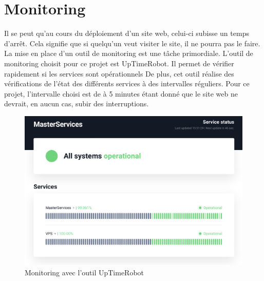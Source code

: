 \section{Monitoring}
Il se peut qu'au cours du déploiement d'un site web, celui-ci subisse un temps d'arrêt. Cela signifie que si quelqu'un veut visiter le site, il ne pourra pas le faire. La mise en place d'un outil de monitoring est une tâche primordiale. 
L'outil de monitoring choisit pour ce projet est UpTimeRobot. Il permet de vérifier rapidement si les services sont opérationnels
De plus, cet outil réalise des vérifications de l'état des différents services à des intervalles réguliers. Pour ce projet, l'intervalle choisi est de à 5 minutes étant donné que le site web ne devrait, en aucun cas, subir des interruptions.

\begin{figure}[H]
    \centering
    \includegraphics[scale=0.3]{img/uptime.png}
    \caption{Monitoring avec l'outil UpTimeRobot}
    \label{UpTimeRobot}
\end{figure}
